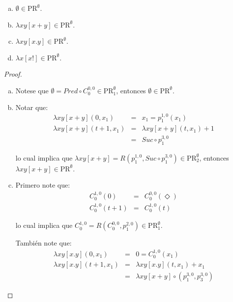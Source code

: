   \begin{lemma}
    \begin{enumerate}[a)]
      \item $\emptyset \in \mathrm{PR}^{\emptyset}$.
      \item $\lambda xy \left[x+y\right] \in \mathrm{PR}^{\emptyset}$.
      \item $\lambda xy\left[x.y\right] \in \mathrm{PR}^{\emptyset}$.
      \item $\lambda x\left[x!\right] \in \mathrm{PR}^{\emptyset}$.
    \end{enumerate}
  \end{lemma}
  \begin{proof}
    \begin{enumerate}[a)]
      \item Notese que $\emptyset = Pred \circ C_{0}^{0,0} \in \mathrm{PR}_{1}^{\emptyset}$, entonces $\emptyset \in
        \mathrm{PR}^{\emptyset}$.

      \item Notar que:
        \begin{eqnarray*}
          \lambda xy \left[x+y\right](0, x_{1}) &=& x_{1} = p_{1}^{1,0}(x_{1}) \\
          \lambda xy \left[x+y\right](t+1, x_{1}) &=& \lambda xy \left[x+y\right](t, x_{1}) + 1 \\
          & =& Suc \circ p_{1}^{3,0}
        \end{eqnarray*}

        \PN lo cual implica que $\lambda xy \left[x+y\right] = R(p_{1}^{1,0}, Suc \circ p_{1}^{3,0}) \in
        \mathrm{PR}_{2}^{\emptyset}$, entonces $\lambda xy \left[x+y\right] \in \mathrm{PR}^{\emptyset}$.

      \item Primero note que:
        \begin{eqnarray*}
          C_{0}^{1,0}(0) &=& C_{0}^{0,0}(\Diamond) \\
          C_{0}^{1,0}(t+1) &=& C_{0}^{1,0}(t)
        \end{eqnarray*}

        \PN lo cual implica que $C_{0}^{1,0} = R(C_{0}^{0,0}, p_{1}^{2,0}) \in \mathrm{PR}_{1}^{\emptyset}$.

        \PN También note que:
        \begin{eqnarray*}
          \lambda xy \left[x.y\right](0, x_{1}) &=& 0 = C_{0}^{1,0}(x_{1}) \\
          \lambda xy \left[x.y\right](t+1, x_{1}) &=& \lambda xy \left[x.y\right](t, x_{1}) + x_{1} \\
          &=& \lambda xy \left[x+y\right] \circ (p_{1}^{3,0}, p_{3}^{3,0})
        \end{eqnarray*}


\end{enumerate}
\end{proof}

